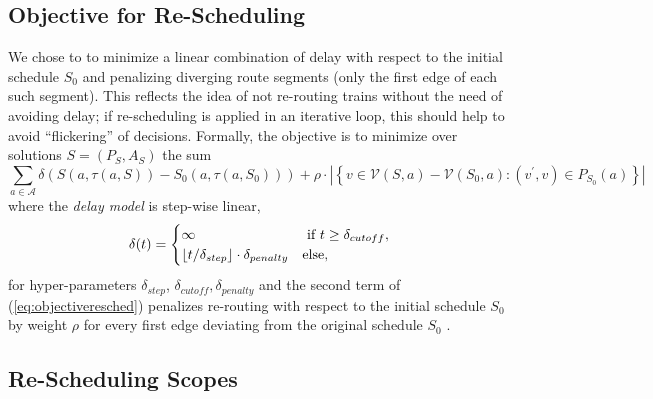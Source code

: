 \documentclass{article}
\DeclarePairedDelimiter{\floor}{\lfloor}{\rfloor}
\begin{document}
\subsection{Objective for Re-Scheduling}
We chose to to minimize a linear combination of delay with respect to the initial schedule $S_0$ and penalizing diverging route segments (only the first edge of each such segment). This reflects the idea of not re-routing trains without the need of avoiding delay; if re-scheduling is applied in an iterative loop, this should help to avoid ``flickering'' of decisions.
%
Formally, the objective is to minimize over solutions $S=(P_S,A_S)$  the sum
\begin{equation}
\sum_{a \in \mathcal{A}} \delta\left(S(a,\tau(a,S)) - S_0(a,\tau(a, S_0))\right) + \rho \cdot \left|\left\{v \in \mathcal{V}(S,a)-\mathcal{V}(S_0,a): (v^\prime,v) \in P_{S_0}(a) \right\}\right| \label{eq:objectiveresched}
\end{equation}
where the \emph{delay model} is step-wise linear,
\begin{equation}
\delta(t) =
\begin{cases}
    \infty & \textrm{ if } t \geq \delta_{cutoff},\\
    \floor{t / \delta_{step}} \cdot \delta_{penalty}  & \textrm{else},
\end{cases}
\end{equation}
for hyper-parameters $\delta_{step}$, $\delta_{cutoff}, \delta_{penalty}$
and the second term of (\ref{eq:objectiveresched}) penalizes re-routing with respect to the initial schedule $S_0$ by weight $\rho$ for every first edge deviating from the original schedule $S_0$ .


\subsection{Re-Scheduling Scopes}\label{subsec:scopers}
\end{document}
